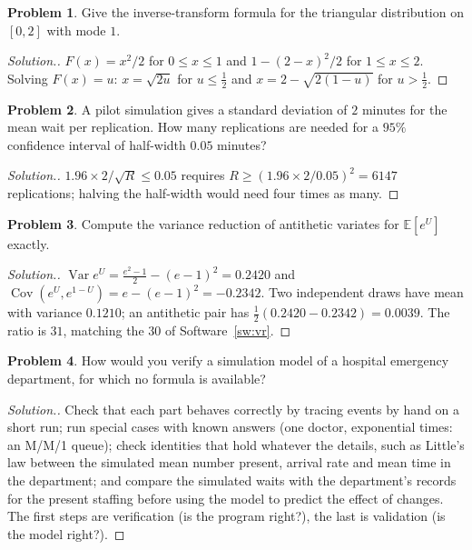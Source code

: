 \documentclass[11pt,a4paper]{article}
\numberwithin{equation}{section}
\theoremstyle{definition}
\newtheorem{problemx}{Problem}[subsection]
\newenvironment{problem}{\begin{problemx}}{\end{problemx}}
\newenvironment{solution}
  {\renewcommand{\qedsymbol}{}\begin{proof}[\textit{Solution}.]}
  {\end{proof}}
\begin{document}
\begin{problem}
Give the inverse-transform formula for the triangular distribution on $[0, 2]$ with mode $1$.
\end{problem}

\begin{solution}
$F(x) = x^2/2$ for $0 \leq x \leq 1$ and $1 - (2 - x)^2/2$ for $1 \leq x \leq 2$. Solving $F(x) = u$: $x = \sqrt{2u}$ for $u \leq \frac12$ and $x = 2 - \sqrt{2(1 - u)}$ for $u > \frac12$.
\end{solution}

\begin{problem}
A pilot simulation gives a standard deviation of $2$ minutes for the mean wait per replication. How many replications are needed for a $95\%$ confidence interval of half-width $0.05$ minutes?
\end{problem}

\begin{solution}
$1.96 \times 2/\sqrt R \leq 0.05$ requires $R \geq (1.96 \times 2/0.05)^2 = 6147$ replications; halving the half-width would need four times as many.
\end{solution}

\begin{problem}
Compute the variance reduction of antithetic variates for $\mathbb E[e^U]$ exactly.
\end{problem}

\begin{solution}
$\operatorname{Var}e^U = \frac{e^2 - 1}2 - (e - 1)^2 = 0.2420$ and $\operatorname{Cov}(e^U, e^{1 - U}) = e - (e - 1)^2 = -0.2342$. Two independent draws have mean with variance $0.1210$; an antithetic pair has $\frac12(0.2420 - 0.2342) = 0.0039$. The ratio is $31$, matching the $30$ of Software~\ref{sw:vr}.
\end{solution}

\begin{problem}
How would you verify a simulation model of a hospital emergency department, for which no formula is available?
\end{problem}

\begin{solution}
Check that each part behaves correctly by tracing events by hand on a short run; run special cases with known answers (one doctor, exponential times: an M/M/1 queue); check identities that hold whatever the details, such as Little's law between the simulated mean number present, arrival rate and mean time in the department; and compare the simulated waits with the
department's records for the present staffing before using the model to predict the effect of changes. The first steps are verification (is the program right?), the last is validation (is the model right?).
\end{solution}
\end{document}

